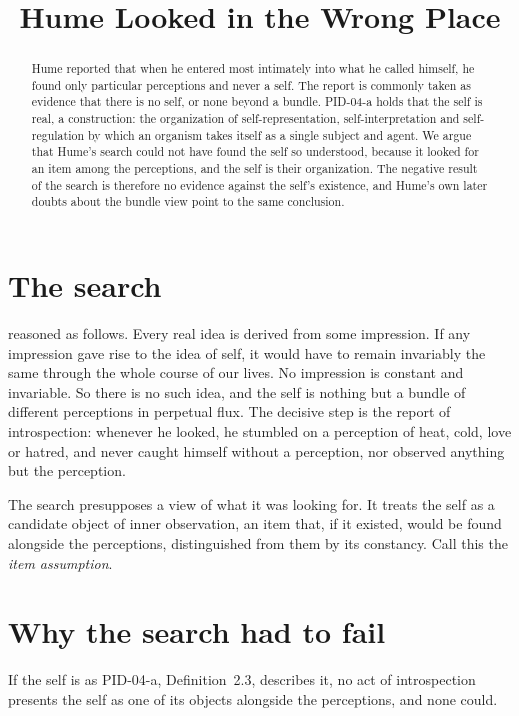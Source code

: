\documentclass{situationist-preprint}
\title{Hume Looked in the Wrong Place}
\begin{document}
\maketitle

\begin{abstract}
Hume reported that when he entered most intimately into what he called himself, he found only particular perceptions and never a self. The report is commonly taken as evidence that there is no self, or none beyond a bundle. PID-04-a holds that the self is real, a construction: the organization of self-representation, self-interpretation and self-regulation by which an organism takes itself as a single subject and agent. We argue that Hume's search could not have found the self so understood, because it looked for an item among the perceptions, and the self is their organization. The negative result of the search is therefore no evidence against the self's existence, and Hume's own later doubts about the bundle view point to the same conclusion.
\end{abstract}

\section{The search}

\citet[1.4.6]{Hume1739} reasoned as follows. Every real idea is derived from some impression. If any impression gave rise to the idea of self, it would have to remain invariably the same through the whole course of our lives. No impression is constant and invariable. So there is no such idea, and the self is nothing but a bundle of different perceptions in perpetual flux. The decisive step is the report of introspection: whenever he looked, he stumbled on a perception of heat, cold, love or hatred, and never caught himself without a perception, nor observed anything but the perception.

The search presupposes a view of what it was looking for. It treats the self as a candidate object of inner observation, an item that, if it existed, would be found alongside the perceptions, distinguished from them by its constancy. Call this the \emph{item assumption}.

\section{Why the search had to fail}

\begin{proposition}\label{p:fail}
If the self is as PID-04-a, Definition~2.3, describes it, no act of introspection presents the self as one of its objects alongside the perceptions, and none could.
\end{proposition}
\end{document}

